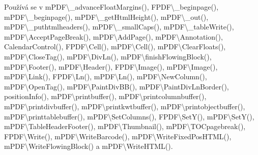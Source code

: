 Používá se v m\-P\-D\-F\textbackslash{}\-\_\-advance\-Float\-Margins(), F\-P\-D\-F\textbackslash{}\-\_\-beginpage(), m\-P\-D\-F\textbackslash{}\-\_\-beginpage(), m\-P\-D\-F\textbackslash{}\-\_\-get\-Html\-Height(), m\-P\-D\-F\textbackslash{}\-\_\-out(), m\-P\-D\-F\textbackslash{}\-\_\-puthtmlheaders(), m\-P\-D\-F\textbackslash{}\-\_\-small\-Caps(), m\-P\-D\-F\textbackslash{}\-\_\-table\-Write(), m\-P\-D\-F\textbackslash{}\-Accept\-Page\-Break(), m\-P\-D\-F\textbackslash{}\-Add\-Page(), m\-P\-D\-F\textbackslash{}\-Annotation(), Calendar\-Control(), F\-P\-D\-F\textbackslash{}\-Cell(), m\-P\-D\-F\textbackslash{}\-Cell(), m\-P\-D\-F\textbackslash{}\-Clear\-Floats(), m\-P\-D\-F\textbackslash{}\-Close\-Tag(), m\-P\-D\-F\textbackslash{}\-Div\-Ln(), m\-P\-D\-F\textbackslash{}finish\-Flowing\-Block(), m\-P\-D\-F\textbackslash{}\-Footer(), m\-P\-D\-F\textbackslash{}\-Header(), F\-P\-D\-F\textbackslash{}\-Image(), m\-P\-D\-F\textbackslash{}\-Image(), m\-P\-D\-F\textbackslash{}\-Link(), F\-P\-D\-F\textbackslash{}\-Ln(), m\-P\-D\-F\textbackslash{}\-Ln(), m\-P\-D\-F\textbackslash{}\-New\-Column(), m\-P\-D\-F\textbackslash{}\-Open\-Tag(), m\-P\-D\-F\textbackslash{}\-Paint\-Div\-B\-B(), m\-P\-D\-F\textbackslash{}\-Paint\-Div\-Ln\-Border(), position\-Info(), m\-P\-D\-F\textbackslash{}printbuffer(), m\-P\-D\-F\textbackslash{}printcolumnbuffer(), m\-P\-D\-F\textbackslash{}printdivbuffer(), m\-P\-D\-F\textbackslash{}printkwtbuffer(), m\-P\-D\-F\textbackslash{}printobjectbuffer(), m\-P\-D\-F\textbackslash{}printtablebuffer(), m\-P\-D\-F\textbackslash{}\-Set\-Columns(), F\-P\-D\-F\textbackslash{}\-Set\-Y(), m\-P\-D\-F\textbackslash{}\-Set\-Y(), m\-P\-D\-F\textbackslash{}\-Table\-Header\-Footer(), m\-P\-D\-F\textbackslash{}\-Thumbnail(), m\-P\-D\-F\textbackslash{}\-T\-O\-Cpagebreak(), F\-P\-D\-F\textbackslash{}\-Write(), m\-P\-D\-F\textbackslash{}\-Write\-Barcode(), m\-P\-D\-F\textbackslash{}\-Write\-Fixed\-Pos\-H\-T\-M\-L(), m\-P\-D\-F\textbackslash{}\-Write\-Flowing\-Block() a m\-P\-D\-F\textbackslash{}\-Write\-H\-T\-M\-L().

